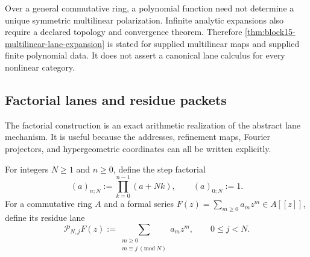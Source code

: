 \begin{boundary}
\label{bnd:block15-multilinear-boundary}
Over a general commutative ring, a polynomial function need not determine a
unique symmetric multilinear polarization.  Infinite analytic expansions also
require a declared topology and convergence theorem.  Therefore
\cref{thm:block15-multilinear-lane-expansion} is stated for supplied
multilinear maps and supplied finite polynomial data.  It does not assert a
canonical lane calculus for every nonlinear category.
\end{boundary}

\subsection{Factorial lanes and residue packets}
\label{subsec:block15-factorial-realization}

The factorial construction is an exact arithmetic realization of the abstract
lane mechanism.  It is useful because the addresses, refinement maps, Fourier
projectors, and hypergeometric coordinates can all be written explicitly.

For integers \(N\ge1\) and \(n\ge0\), define the step factorial
\[
 (a)_{n;N}:=\prod_{k=0}^{n-1}(a+Nk),
 \qquad (a)_{0;N}:=1.
\]
For a commutative ring \(A\) and a formal series
\(F(z)=\sum_{m\ge0}a_mz^m\in A[[z]]\), define its residue lane
\[
 \mathcal P_{N,j}F(z)
 :=
 \sum_{\substack{m\ge0\\m\equiv j\ (\mathrm{mod}\ N)}}a_mz^m,
 \qquad 0\le j<N.
\]

